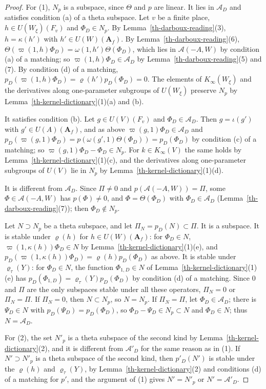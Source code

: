 \begin{proof}
For (1), $N_p$ is a subspace, since $\Theta$ and $p$ are linear. It lies in
$\mathcal A_D$ and satisfies condition (a) of a theta subspace. Let $v$ be a
finite place, $h\in U(W_\xi)(F_v)$ and $\Phi_D\in N_p$. By
Lemma~\ref{th-darboux-reading}(3), $h=\kappa(h')$ with
$h'\in U(W)(\mathbf A_f)$. By Lemma~\ref{th-darboux-reading}(6),
$\Theta(\varpi(1,h)\Phi_D)=\omega(1,h')\Theta(\Phi_D)$, which lies in
$\mathcal A(-A,W)$ by condition (a) of a matching; so
$\varpi(1,h)\Phi_D\in\mathcal A_D$ by Lemma~\ref{th-darboux-reading}(5) and
(7). By condition (d) of a matching,
$p_D(\varpi(1,h)\Phi_D)=\varrho(h')p_D(\Phi_D)=0$. The elements of
$K_\infty(W_\xi)$ and the derivatives along one-parameter subgroups of
$U(W_\xi)$ preserve $N_p$ by Lemma~\ref{th-kernel-dictionary}(1)(a) and (b).

It satisfies condition (b). Let $g\in U(V)(F_v)$ and $\Phi_D\in\mathcal A_D$.
Then $g=\iota(g')$ with $g'\in U(A)(\mathbf A_f)$, and as above
$\varpi(g,1)\Phi_D\in\mathcal A_D$ and $p_D(\varpi(g,1)\Phi_D)=
p(\omega(g',1)\Theta(\Phi_D))=p_D(\Phi_D)$ by condition (c) of a matching; so
$\varpi(g,1)\Phi_D-\Phi_D\in N_p$. For $k\in K_\infty(V)$ the same holds by
Lemma~\ref{th-kernel-dictionary}(1)(c), and the derivatives along
one-parameter subgroups of $U(V)$ lie in $N_p$ by
Lemma~\ref{th-kernel-dictionary}(1)(d).

It is different from $\mathcal A_D$. Since $\Pi\neq0$ and
$p(\mathcal A(-A,W))=\Pi$, some $\Phi\in\mathcal A(-A,W)$ has $p(\Phi)\neq0$,
and $\Phi=\Theta(\Phi_D)$ with $\Phi_D\in\mathcal A_D$
(Lemma~\ref{th-darboux-reading}(7)); then $\Phi_D\notin N_p$.

Let $N\supset N_p$ be a theta subspace, and let
$\Pi_N=p_D(N)\subset\Pi$. It is a subspace. It is stable under $\varrho(h)$
for $h\in U(W)(\mathbf A_f)$: for $\Phi_D\in N$,
$\varpi(1,\kappa(h))\Phi_D\in N$ by Lemma~\ref{th-kernel-dictionary}(1)(e),
and $p_D(\varpi(1,\kappa(h))\Phi_D)=\varrho(h)p_D(\Phi_D)$ as above. It is
stable under $\varrho_\tau(Y)$: for $\Phi_D\in N$, the function
$\Phi_{1,D}\in N$ of Lemma~\ref{th-kernel-dictionary}(1)(e) has
$p_D(\Phi_{1,D})=\varrho_\tau(Y)p_D(\Phi_D)$ by condition (d) of a matching.
Since $0$ and $\Pi$ are the only subspaces stable under all these operators,
$\Pi_N=0$ or $\Pi_N=\Pi$. If $\Pi_N=0$, then $N\subset N_p$, so $N=N_p$. If
$\Pi_N=\Pi$, let $\Phi_D\in\mathcal A_D$; there is $\Psi_D\in N$ with
$p_D(\Psi_D)=p_D(\Phi_D)$, so $\Phi_D-\Psi_D\in N_p\subset N$ and
$\Phi_D\in N$; thus $N=\mathcal A_D$.

For (2), the set $N'_p$ is a theta subspace of the second kind by
Lemma~\ref{th-kernel-dictionary}(2), and it is different from
$\mathcal A'_D$ for the same reason as in (1). If $N'\supset N'_p$ is a theta
subspace of the second kind, then $p'_D(N')$ is stable under the $\varrho(h)$
and $\varrho_\tau(Y)$, by Lemma~\ref{th-kernel-dictionary}(2) and conditions
(d) of a matching for $p'$, and the argument of (1) gives $N'=N'_p$ or
$N'=\mathcal A'_D$.
\end{proof}

